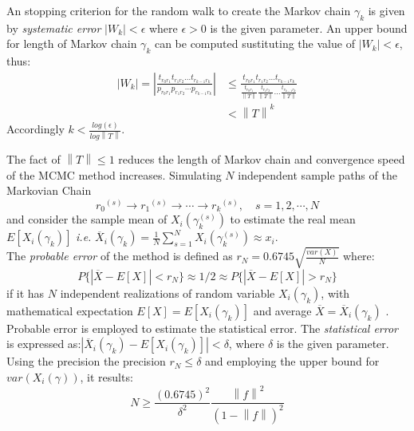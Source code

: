 \documentclass{juliacon}
\begin{document}
An stopping criterion for the random walk to create the Markov chain $\gamma_k$ is given by \textit{systematic error} $\left | W_k \right| < \epsilon$
where $\epsilon > 0$ is the given parameter. An upper bound for length of Markov chain $\gamma_k$ can be computed sustituting the value of $\left | W_k \right| < \epsilon$, thus:  
\begin{equation}
 \begin{array}{ll}
 \left|W_{k}\right|=| \frac{t_{r_{0} r_{1}} t_{r_{1} r_{2}} \dots t_{r_{k-1} r_{k}}}{p_{r_{0} r_{1}} p_{r_{1} r_{2}} \cdots p_{r_{k-1} r_{k}}} | &  \le \frac{t_{r_{0} r_{1}} t_{r_{1} r_{2}} \dots t_{r_{k-1} r_{k}}} {\frac{t_{r_{0} r_{1}}}{\left \| T \right \|} \frac{t_{r_{1} r_{2}}}{\left \| T \right \|} \dots \frac{t_{r_{k-1} r_{k}}}{\left \| T \right \|}} \\
 & < {\left \| T \right \|}^k
 \end{array}
\end{equation}
Accordingly $k < \frac{log(\epsilon)}{log \left \| T \right \|}$.

The fact of $\left \| T \right \| \le 1$ reduces the length of Markov chain and convergence speed of the MCMC method increases. Simulating $N$ independent sample paths of the Markovian Chain $${r_0}^{(s)} \rightarrow {r_1}^{(s)} \rightarrow \cdots \rightarrow {r_k}^{(s)}, \quad  s = 1,2, \cdots ,N $$ and consider the sample mean of $X_i(\gamma_k^{(s)})$ to estimate the real mean $E[X_i(\gamma_k)]$ \textit{i.e.} $\overline{X}_i(\gamma_k)= \frac{1}{N}\sum_{s=1}^N X_i(\gamma_k^{(s)}) \approx x_i $.\\

The \textit{probable error} of the method is defined as $r_N = 0.6745\sqrt{\frac{var(X)}{N}}$ where:
$$P\{ \left|\overline{X} - E\left[ X \right] \right| < r_N \} \approx 1/2 \approx P\{ \left|\overline{X}-E\left[X\right] \right| > r_N \}$$ if it has $N$ independent realizations of random variable $X_i(\gamma_k)$, with mathematical expectation $E[X]= E\left[X_i\left(\gamma_k\right)\right]$ and average $\overline{X} = \overline{X}_i(\gamma_k)$ \cite{branford2005}. Probable error is employed to estimate the statistical error.
The \textit{statistical error} is expressed as:$\left|\overline{X}_i\left(\gamma_k \right)-E\left[X_i\left(\gamma_k\right)\right]\right|<\delta$, where $\delta$ is the given parameter. Using the precision the precision $r_N \le \delta$ and employing the upper bound for $var(X_i(\gamma))$, it results: 
\begin{equation}
 \label{vln-7}
 N \ge \frac{(0.6745)^2}{\delta^2} \frac{{\left \| f \right \|}^2}{(1-\left \| f \right \|)^2}
\end{equation}
\end{document}

